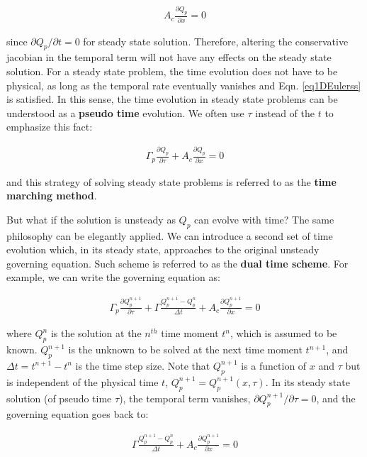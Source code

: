 \documentclass[12pt, letterpaper]{report}
\begin{document}
\begin{align}\label{eq1DEulerss}
   A_c \frac{\partial Q_p}{\partial x} = 0
\end{align}

since $\partial Q_p / \partial t = 0$ for steady state solution. Therefore, altering the
conservative jacobian in the temporal term will not have any effects on the steady state solution.
For a steady state problem, the time evolution does not have to be physical, as long as the temporal
rate eventually vanishes and Eqn. \ref{eq1DEulerss} is satisfied. In this sense, the time evolution
in steady state problems can be understood as a {\bf pseudo time} evolution. We often use $\tau$
instead of the $t$ to emphasize this fact:

\begin{align*}
   \Gamma_p \frac{\partial Q_p}{\partial \tau} + A_c \frac{\partial Q_p}{\partial x} = 0
\end{align*}

and this strategy of solving steady state problems is referred to as the {\bf time marching
method}.\paraspace

But what if the solution is unsteady as $Q_p$ can evolve with time? The same philosophy can be
elegantly applied. We can introduce a second set of time evolution which, in its steady state,
approaches to the original unsteady governing equation. Such scheme is referred to as the {\bf dual
time scheme}. For example, we can write the governing equation as:

\begin{align*}
   \Gamma_p \frac{\partial Q_p^{n+1}}{\partial \tau} + \Gamma \frac{Q_p^{n+1} - Q_p^n}{\Delta t} + A_c
   \frac{\partial Q_p^{n+1}}{\partial x} = 0
\end{align*}

where $Q_p^n$ is the solution at the $n^{th}$ time moment $t^n$, which is assumed to be known.
$Q_p^{n+1}$ is the unknown to be solved at the next time moment $t^{n+1}$, and $\Delta t = t^{n+1} -
t^n$ is the time step size. Note that $Q_p^{n+1}$ is a function of $x$ and $\tau$ but is independent
of the physical time $t$, $Q_p^{n+1} = Q_p^{n+1} (x,\tau)$. In its steady state solution (of pseudo
time $\tau$), the temporal term vanishes, $\partial Q_p^{n+1} / \partial \tau = 0$, and the
governing equation goes back to:

\begin{align*}
   \Gamma \frac{Q_p^{n+1} - Q_p^n}{\Delta t} + A_c \frac{\partial Q_p^{n+1}}{\partial x} = 0
\end{align*}
\end{document}
